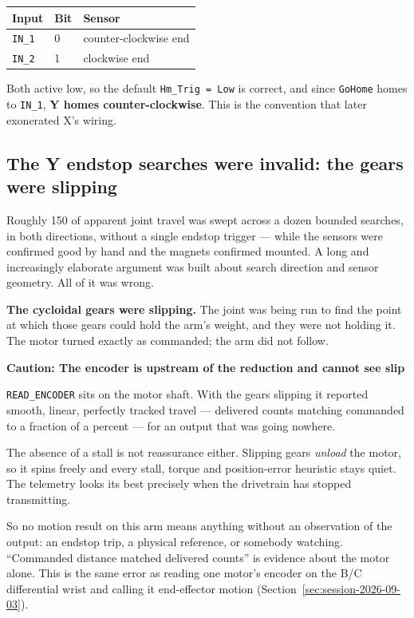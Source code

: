 \documentclass[11pt,letterpaper]{article}
\newenvironment{caution}[1]{%
    \par\addvspace{8pt}%
    \noindent{\color{cautionred}\rule{\linewidth}{0.8pt}}\par\vspace{2pt}
    \noindent\textbf{\color{cautionred}Caution: #1}\par\vspace{2pt}
}{%
    \par\vspace{2pt}\noindent{\color{cautionred}\rule{\linewidth}{0.4pt}}%
    \par\addvspace{8pt}%
}
\begin{document}
\begin{center}
\begin{tabular}{lll}
\toprule
\textbf{Input} & \textbf{Bit} & \textbf{Sensor} \\ \midrule
\texttt{IN\_1} & 0 & counter-clockwise end \\
\texttt{IN\_2} & 1 & clockwise end \\
\bottomrule
\end{tabular}
\end{center}

Both active low, so the default \texttt{Hm\_Trig = Low} is correct, and since
\texttt{GoHome} homes to \texttt{IN\_1}, \textbf{Y homes counter-clockwise}. This
is the convention that later exonerated X's wiring.

\subsection{The Y endstop searches were invalid: the gears were slipping}
Roughly 150\textdegree{} of apparent joint travel was swept across a dozen bounded
searches, in both directions, without a single endstop trigger --- while the
sensors were confirmed good by hand and the magnets confirmed mounted. A long and
increasingly elaborate argument was built about search direction and sensor
geometry. All of it was wrong.

\textbf{The cycloidal gears were slipping.} The joint was being run to find the
point at which those gears could hold the arm's weight, and they were not holding
it. The motor turned exactly as commanded; the arm did not follow.

\begin{caution}{The encoder is upstream of the reduction and cannot see slip}
\texttt{READ\_ENCODER} sits on the motor shaft. With the gears slipping it
reported smooth, linear, perfectly tracked travel --- delivered counts matching
commanded to a fraction of a percent --- for an output that was going nowhere.

The absence of a stall is not reassurance either. Slipping gears \emph{unload} the
motor, so it spins freely and every stall, torque and position-error heuristic
stays quiet. The telemetry looks its best precisely when the drivetrain has
stopped transmitting.

So no motion result on this arm means anything without an observation of the
output: an endstop trip, a physical reference, or somebody watching. ``Commanded
distance matched delivered counts'' is evidence about the motor alone. This is the
same error as reading one motor's encoder on the B/C differential wrist and
calling it end-effector motion (Section~\ref{sec:session-2026-09-03}).
\end{caution}
\end{document}
